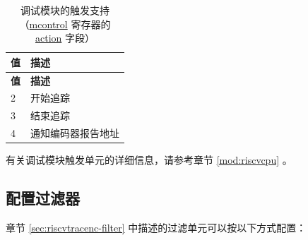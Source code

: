 \documentclass[main\_\_CN.tex]{subfiles}
\begin{document}
\begin{itemize}
            \begin{longtable}[c]{ |l|l| }
    \caption{调试模块的触发支持（\hyperref[regdesc:MCONTROL]{mcontrol} 寄存器的 \hyperref[fielddesc:MCONTROLACTION]{action} 字段）}
    \label{tab:debug_mcontrol}
    \\\hline\rowcolor{lightgray}
    \textbf{值} & \textbf{描述} \\\hline
    \endfirsthead
    \textbf{值} & \textbf{描述} \\\hline
    \endhead
    \endfoot
    \endlastfoot

    2 & 开始追踪 \\\hline
    3 & 结束追踪 \\\hline
    4 & 通知编码器报告地址 \\\hline

    \end{longtable}
\end{itemize}

有关调试模块触发单元的详细信息，请参考章节 \ref{mod:riscvcpu} \textit{}。


\subsection{配置过滤器}

章节 \ref{sec:riscvtracenc-filter} 中描述的过滤单元可以按以下方式配置：
\end{document}
